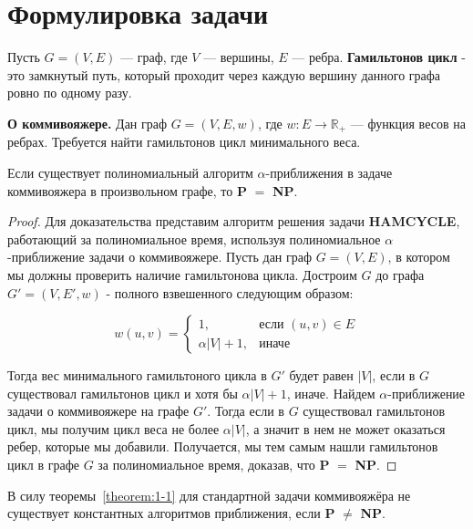 \section{Формулировка задачи}
\begin{definition}
    Пусть $G = (V, E)$ --- граф, где $V$ --- вершины, $E$ --- ребра.
    \textnormal{\textbf{Гамильтонов цикл}} - это замкнутый путь,
    который проходит через каждую вершину данного графа ровно по одному разу.
\end{definition}

\begin{problem}
\textnormal{\textbf{О коммивояжере.}} Дан граф $G = (V, E, w)$, где $w: E \rightarrow \mathbb{R}_{+}$ --- функция весов на ребрах.
Требуется найти гамильтонов цикл минимального веса.
\end{problem}

\begin{theorem}
    \label{theorem:1-1}
    Если существует полиномиальный алгоритм $\alpha$-приближения в задаче коммивояжера в произвольном графе,
    то \textnormal{\textbf{P}} $=$ \textnormal{\textbf{NP}}.
\end{theorem}
\begin{proof}
    Для доказательства представим алгоритм решения задачи \textbf{HAMCYCLE}, работающий за полиномиальное время,
    используя полиномиальное $\alpha$-приближение задачи о коммивояжере.
    Пусть дан граф $G = (V, E)$, в котором мы должны проверить наличие гамильтонова цикла.
    Достроим $G$ до графа $G' = (V, E', w)$ - полного взвешенного следующим образом:

    $$w(u, v) =
        \begin{cases}
            1,              & \text{если } (u, v) \in E \\
            \alpha |V| + 1, & \text{иначе}
        \end{cases}$$

    Тогда вес минимального гамильтоного цикла в $G'$ будет равен $|V|$, если в $G$ существовал гамильтонов цикл и хотя бы $\alpha |V| + 1$, иначе.
    Найдем $\alpha$-приближение задачи о коммивояжере на графе $G'$.
    Тогда если в $G$ существовал гамильтонов цикл, мы получим цикл веса не более $\alpha |V|$, а значит в нем не может оказаться ребер, которые мы добавили.
    Получается, мы тем самым нашли гамильтонов цикл в графе $G$ за полиномиальное время,
    доказав, что \textbf{P} $=$ \textbf{NP}.
\end{proof}
\begin{corollary}
    В силу теоремы~\ref{theorem:1-1} для стандартной задачи коммивояжёра не существует константных алгоритмов приближения, если \textnormal{\textbf{P}} $\neq$ \textnormal{\textbf{NP}}.
\end{corollary}